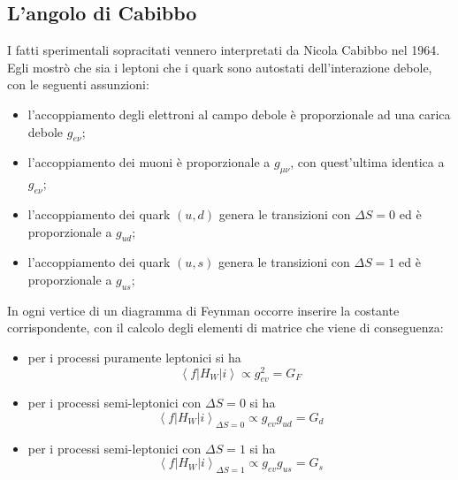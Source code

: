 \documentclass{subnucbo}
\begin{document}
\subsection{L'angolo di Cabibbo}
\label{subsec:cabibbo_angle}
I fatti sperimentali sopracitati vennero interpretati da Nicola Cabibbo nel 1964. Egli mostrò che sia i leptoni che i quark sono autostati dell'interazione debole, con le seguenti assunzioni:
\begin{itemize}
        \item l'accoppiamento degli elettroni al campo debole è proporzionale ad una carica debole $g_{e\nu}$;
        \item l'accoppiamento dei muoni è proporzionale a $g_{\mu\nu}$, con quest'ultima identica a $g_{e\nu}$;
        \item l'accoppiamento dei quark $(u, d)$ genera le transizioni con $\Delta S = 0$ ed è proporzionale a $g_{ud}$;
        \item l'accoppiamento dei quark $(u, s)$ genera le transizioni con $\Delta S = 1$ ed è proporzionale a $g_{us}$;
\end{itemize}
In ogni vertice di un diagramma di Feynman occorre inserire la costante corrispondente, con il calcolo degli elementi di matrice che viene di conseguenza:
\begin{itemize}
        \item per i processi puramente leptonici si ha
                \begin{equation}
                        \left\langle f \left| H _ { W } \right| i \right\rangle \propto g _ { e v } ^ { 2 } = G _ { F }
                        \label{eq:genu}
                \end{equation}
        \item per i processi semi-leptonici con $\Delta S = 0$ si ha
                \begin{equation}
                \left\langle f \left| H _ { W } \right| i \right\rangle _ { \Delta S = 0 } \propto g _ { e v } g _ { u d } = G _ { d }
                \label{eq:gd}
        \end{equation}
\item per i processi semi-leptonici con $\Delta S = 1$ si ha
        \begin{equation}
                \left\langle f \left| H _ { W } \right| i \right\rangle _ { \Delta S = 1 } \propto g _ { e v } g _ { u s } = G _ { s }
                \label{eq:gs}
        \end{equation}
\end{itemize}
\end{document}
